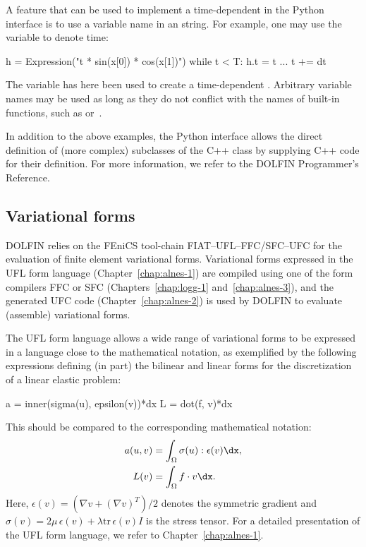 A feature that can be used to implement a time-dependent 
in the Python interface is to use a variable name in an 
string.  For example, one may use the variable  to denote time:
\begin{python}
h = Expression("t * sin(x[0]) * cos(x[1])")
while t < T:
    h.t = t
    ...
    t += dt
\end{python}
The  variable has here been used to create a time-dependent
. Arbitrary variable names may be used as long as they
do not conflict with the names of built-in functions, such as 
or~.

In addition to the above examples, the Python interface allows
the direct definition of (more complex) subclasses of the C++
 class by supplying C++ code for their definition. For
more information, we refer to the DOLFIN Programmer's Reference.

\subsection{Variational forms}

DOLFIN relies on the FEniCS tool-chain FIAT--UFL--FFC/SFC--UFC for the
evaluation of finite element variational forms. Variational forms
expressed in the UFL form language (Chapter~\ref{chap:alnes-1})
are compiled using one of the form compilers FFC or SFC
(Chapters~\ref{chap:logg-1} and~\ref{chap:alnes-3}), and the generated
UFC code (Chapter~\ref{chap:alnes-2}) is used by DOLFIN to
evaluate (assemble) variational forms.

The UFL form language allows a wide range of variational forms to be
expressed in a language close to the mathematical notation, as exemplified
by the following expressions defining (in part) the bilinear and linear
forms for the discretization of a linear elastic problem:
\begin{uflcode}
a = inner(sigma(u), epsilon(v))*dx
L = dot(f, v)*dx
\end{uflcode}
This should be compared to the corresponding mathematical notation:
\begin{align} \label{eq:logg-2:elasticity1}
  a(u, v) &= \int_{\Omega} \sigma(u) : \epsilon(v) \dx,
\\
  L(v)    &= \int_{\Omega} f \cdot v \dx.
\end{align}
Here, $\epsilon(v) = (\nabla v + (\nabla v)^{T}) / 2$ denotes the
symmetric gradient and $\sigma(v) = 2 \mu \, \epsilon(v) + \lambda
\mathrm{tr} \, \epsilon(v) I$ is the stress tensor. For a detailed
presentation of the UFL form language, we refer to
Chapter~\ref{chap:alnes-1}.

